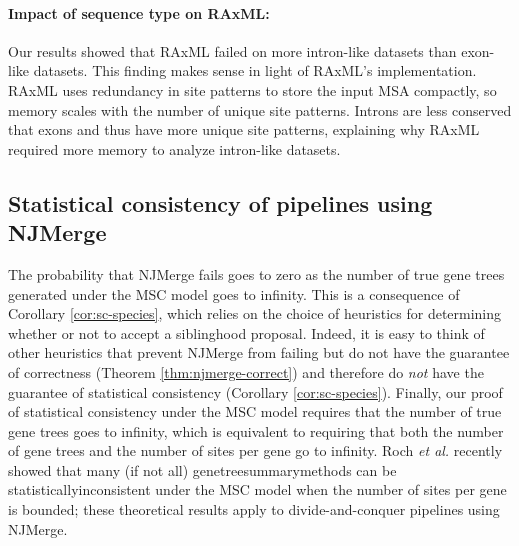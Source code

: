 \paragraph{Impact of sequence type on RAxML:}
Our results showed that RAxML failed on more intron-like datasets than exon-like datasets.
This finding makes sense in light of RAxML's implementation.
RAxML uses redundancy in site patterns to store the input MSA compactly, so memory scales with the number of unique site patterns. 
Introns are less conserved that exons and thus have more unique site patterns, explaining why RAxML required more memory to analyze intron-like datasets.

\subsection{Statistical consistency of pipelines using NJMerge}
The probability that NJMerge fails goes to zero as the number of true gene trees generated under the MSC model goes to infinity.
This is a consequence of Corollary \ref{cor:sc-species}, which relies on the choice of heuristics for determining whether or not to accept a siblinghood proposal.
Indeed, it is easy to think of other heuristics that prevent NJMerge from failing but do not have the guarantee of correctness (Theorem \ref{thm:njmerge-correct}) and therefore do {\em not} have the guarantee of statistical consistency (Corollary \ref{cor:sc-species}).
Finally, our proof of statistical consistency under the MSC model requires that the number of true gene trees goes to infinity, which is equivalent to requiring that both the number of gene trees and the number of sites per gene go to infinity.
Roch {\em et al.} \cite{roch2018long} recently showed that many (if not all) \glspl{genetreesummarymethod} can be \gls{statisticallyinconsistent} under the MSC model when the number of sites per gene is 
\clearpage
\noindent bounded; these theoretical results apply to divide-and-conquer pipelines using NJMerge.

